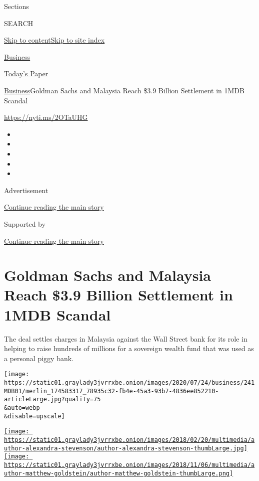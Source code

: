 Sections

SEARCH

\protect\hyperlink{site-content}{Skip to
content}\protect\hyperlink{site-index}{Skip to site index}

\href{https://www.nytimes3xbfgragh.onion/section/business}{Business}

\href{https://myaccount.nytimes3xbfgragh.onion/auth/login?response_type=cookie\&client_id=vi}{}

\href{https://www.nytimes3xbfgragh.onion/section/todayspaper}{Today's
Paper}

\href{/section/business}{Business}\textbar{}Goldman Sachs and Malaysia
Reach \$3.9 Billion Settlement in 1MDB Scandal

\url{https://nyti.ms/2OTaUHG}

\begin{itemize}
\item
\item
\item
\item
\item
\end{itemize}

Advertisement

\protect\hyperlink{after-top}{Continue reading the main story}

Supported by

\protect\hyperlink{after-sponsor}{Continue reading the main story}

\hypertarget{goldman-sachs-and-malaysia-reach-39-billion-settlement-in-1mdb-scandal}{%
\section{Goldman Sachs and Malaysia Reach \$3.9 Billion Settlement in
1MDB
Scandal}\label{goldman-sachs-and-malaysia-reach-39-billion-settlement-in-1mdb-scandal}}

The deal settles charges in Malaysia against the Wall Street bank for
its role in helping to raise hundreds of millions for a sovereign wealth
fund that was used as a personal piggy bank.

\texttt{[image: https://static01.graylady3jvrrxbe.onion/images/2020/07/24/business/241MDB01/merlin\_174583317\_78935c32-fb4e-45a3-93b7-4836ee852210-articleLarge.jpg?quality=75\\\&auto=webp\\\&disable=upscale]}

\href{https://www.nytimes3xbfgragh.onion/by/alexandra-stevenson}{\texttt{[image: https://static01.graylady3jvrrxbe.onion/images/2018/02/20/multimedia/author-alexandra-stevenson/author-alexandra-stevenson-thumbLarge.jpg]}}\href{https://www.nytimes3xbfgragh.onion/by/matthew-goldstein}{\texttt{[image: https://static01.graylady3jvrrxbe.onion/images/2018/11/06/multimedia/author-matthew-goldstein/author-matthew-goldstein-thumbLarge.png]}}

